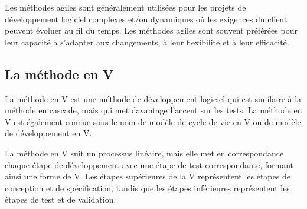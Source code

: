 Les méthodes agiles sont généralement utilisées pour les projets de développement logiciel complexes et/ou dynamiques où les exigences du client peuvent évoluer au fil du temps. Les méthodes agiles sont souvent préférées pour leur capacité à s'adapter aux changements, à leur flexibilité et à leur efficacité.

\subsection{La méthode en V}\label{subsec:methode-en-v}
La méthode en V est une méthode de développement logiciel qui est similaire à la méthode en cascade, mais qui met davantage l'accent sur les tests. La méthode en V est également connue sous le nom de modèle de cycle de vie en V ou de modèle de développement en V.

La méthode en V suit un processus linéaire, mais elle met en correspondance chaque étape de développement avec une étape de test correspondante, formant ainsi une forme de V. Les étapes supérieures de la V représentent les étapes de conception et de spécification, tandis que les étapes inférieures représentent les étapes de test et de validation.

